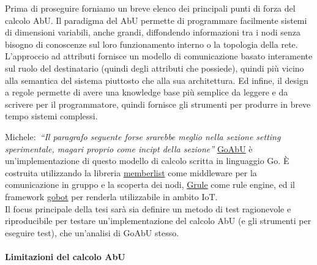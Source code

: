 \documentclass[12pt, a4paper]{article}
\newcommand{\michele}[1]{{\color{red}Michele:~}{\itshape``{#1}''}}
\begin{document}
Prima di proseguire forniamo un breve elenco dei principali punti di forza del calcolo AbU. Il paradigma del AbU permette di programmare facilmente sistemi di dimensioni variabili, anche grandi, diffondendo informazioni tra i nodi senza bisogno di conoscenze sul loro funzionamento interno o la topologia della rete.
L'approccio ad attributi fornisce un modello di comunicazione basato interamente sul ruolo del destinatario (quindi degli attributi che possiede), quindi più vicino alla semantica del sistema piuttosto che alla sua architettura.
Ed infine, il design a regole permette di avere una knowledge base più semplice da leggere e da scrivere per il programmatore, quindi fornisce gli strumenti per produrre in breve tempo sistemi complessi.

\michele{Il paragrafo seguente forse srarebbe meglio nella sezione setting sperimentale, magari proprio come incipt della sezione}
\href{https://github.com/abu-lang/goabu}{GoAbU} è un'implementazione di questo modello di calcolo scritta in linguaggio Go.
È costruita utilizzando la libreria \href{https://github.com/hashicorp/memberlist}{memberlist} come middleware per la comunicazione in gruppo e la scoperta dei nodi,  \href{https://github.com/hyperjumptech/grule-rule-engine}{Grule} come rule engine, ed il framework \href{https://github.com/hybridgroup/gobot/}{gobot} per renderla utilizzabile in ambito IoT.\\
Il focus principale della tesi sarà sia definire un metodo di test ragionevole e riproducibile per testare un'implementazione del calcolo AbU (e gli strumenti per eseguire test), che un'analisi di GoAbU stesso.

\paragraph{Limitazioni del calcolo AbU}
\end{document}
